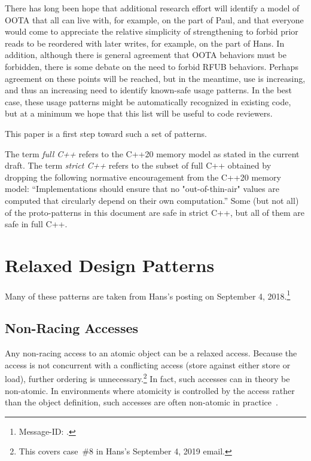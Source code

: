 \documentclass[10]{article}
\begin{document}
There has long been hope that additional research effort will identify
a model of OOTA that all can live with, for example, on the part of Paul,
and that everyone would come to appreciate the relative simplicity of
strengthening  to forbid prior reads to be
reordered with later writes, for example, on the part of Hans.
In addition, although there is general agreement that OOTA behaviors
must be forbidden, there is some debate on the need to forbid
RFUB behaviors.
Perhaps agreement on these points will be reached, but in the meantime,
 use is increasing, and thus an increasing need
to identify known-safe usage patterns.
In the best case, these usage patterns might be automatically recognized
in existing code, but at a minimum we hope that this list will be
useful to code reviewers.

This paper is a first step toward such a set of patterns.

The term \emph{full C++} refers to the C++20 memory model as stated in
the current draft.
The term \emph{strict C++} refers to the subset of full C++ obtained
by dropping the following normative encouragement from the C++20 memory
model:
``Implementations should ensure that no "out-of-thin-air" values are
computed that circularly depend on their own computation.''
Some (but not all) of the proto-patterns in this document are safe in
strict C++, but all of them are safe in full C++.

\section{Relaxed Design Patterns}
\label{sec:Relaxed Design Patterns}

Many of these patterns are taken from Hans's 
posting on September 4, 2018.\footnote{
	Message-ID: .}

\subsection{Non-Racing Accesses}
\label{sec:Non-Racing Accesses}

Any non-racing access to an atomic object can be a relaxed access.
Because the access is not concurrent with a conflicting access (store
against either store or load), further ordering is unnecessary.\footnote{
	This covers case~\#8 in Hans's September 4, 2019 email.}
In fact, such accesses can in theory be non-atomic.
In environments where atomicity is controlled by the access rather
than the object definition, such accesses are often non-atomic in
practice~\cite{JadeAlglave2019WhoAfraidCompiler}.
\end{document}
